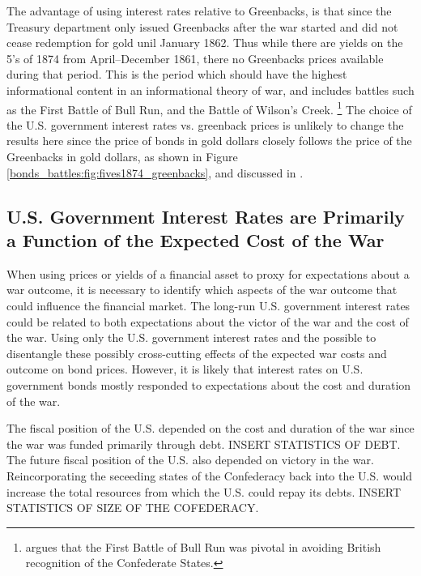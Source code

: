 The advantage of using interest rates relative to Greenbacks, is that since the Treasury department only issued Greenbacks after the war started and did not cease redemption for gold unil January 1862.
Thus while there are yields on the 5's of 1874 from April--December 1861, there no Greenbacks prices available during that period.
This is the period which should have the highest informational content in an informational theory of war, and includes battles such as the First Battle of Bull Run, and the Battle of Wilson's Creek.%
\footnote{\textcite{Poast2012} argues that the First Battle of Bull Run was pivotal in avoiding British recognition of the Confederate States.}
The choice of the U.S. government interest rates vs. greenback prices is unlikely to change the results here since the price of bonds in gold dollars closely follows the price of the Greenbacks in gold dollars, as shown in Figure \ref{bonds_battles:fig:fives1874_greenbacks}, and discussed in \textcite{Roll1972}.



\subsection{U.S. Government Interest Rates are Primarily a Function of the Expected Cost of the War}
\label{bonds_battles:sec:u.s.-governm-inter}

When using prices or yields of a financial asset to proxy for expectations about a war outcome, it is necessary to identify which aspects of the war outcome that could influence the financial market.
The long-run U.S. government interest rates could be related to both expectations about the victor of the war and the cost of the war.
Using only the U.S. government interest rates and the  possible to disentangle these possibly cross-cutting effects of the expected war costs and outcome on bond prices.
However, it is likely that interest rates on U.S. government bonds mostly responded to expectations about the cost and duration of the war.

The fiscal position of the U.S. depended on the cost and duration of the war since the war was funded primarily through debt.
INSERT STATISTICS OF DEBT.
The future fiscal position of the U.S. also depended on victory in the war.
Reincorporating the seceeding states of the Confederacy back into the U.S. would increase the total resources from which the U.S. could repay its debts.
INSERT STATISTICS OF SIZE OF THE COFEDERACY.

